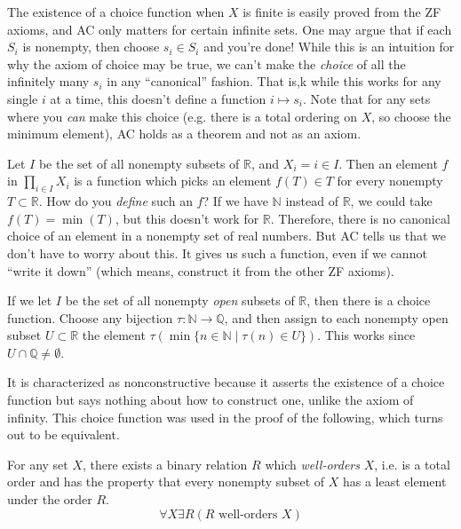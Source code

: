 \documentclass{article}
\begin{document}
    The existence of a choice function when $X$ is finite is easily proved from the ZF axioms, and AC only matters for certain infinite sets. One may argue that if each $S_i$ is nonempty, then choose $s_i \in S_i$ and you're done! While this is an intuition for why the axiom of choice may be true, we can't make the \textit{choice} of all the infinitely many $s_i$ in any ``canonical'' fashion. That is,k while this works for any single $i$ at a time, this doesn't define a function $i \mapsto s_i$. Note that for any sets where you \textit{can} make this choice (e.g. there is a total ordering on $X$, so choose the minimum element), AC holds as a theorem and not as an axiom. 

    \begin{example}
      Let $I$ be the set of all nonempty subsets of $\mathbb{R}$, and $X_i = i \in I$. Then an element $f$ in $\prod_{i \in I} X_i$ is a function which picks an element $f(T) \in T$ for every nonempty $T \subset \mathbb{R}$. How do you \textit{define} such an $f$? If we have $\mathbb{N}$ instead of $\mathbb{R}$, we could take $f(T) = \min(T)$, but this doesn't work for $\mathbb{R}$. Therefore, there is no canonical choice of an element in a nonempty set of real numbers. But AC tells us that we don't have to worry about this. It gives us such a function, even if we cannot ``write it down'' (which means, construct it from the other ZF axioms).  

      If we let $I$ be the set of all nonempty \textit{open} subsets of $\mathbb{R}$, then there is a choice function. Choose any bijection $\tau: \mathbb{N} \rightarrow \mathbb{Q}$, and then assign to each nonempty open subset $U \subset \mathbb{R}$ the element $\tau (\min\{n \in \mathbb{N} \mid \tau(n) \in U\})$. This works since $U \cap \mathbb{Q} \neq \emptyset$. 
    \end{example}

    It is characterized as nonconstructive because it asserts the existence of a choice function but says nothing about how to construct one, unlike the axiom of infinity. This choice function was used in the proof of the following, which turns out to be equivalent.  

    \begin{axiom}
      For any set $X$, there exists a binary relation $R$ which \textit{well-orders} $X$, i.e. is a total order and has the property that every nonempty subset of $X$ has a least element under the order $R$. 
      \begin{equation}
        \forall X \exists R (R \text{ well-orders } X)
      \end{equation}
    \end{axiom}
\end{document}
